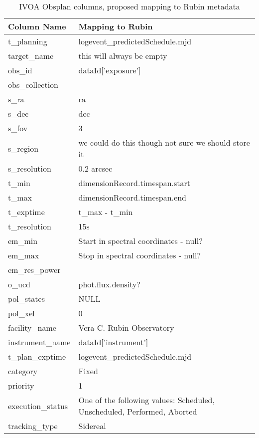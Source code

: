 
\begin{table}
\begin{tabular}{ |l|l| }
\hline
\textbf{Column Name} & \textbf{Mapping to Rubin} \\
\hline
t\_planning & logevent\_predictedSchedule.mjd \\
\hline
target\_name & this will always be empty \\
\hline
obs\_id & dataId['exposure'] \\
\hline
obs\_collection &  \\
\hline
s\_ra & ra \\
\hline
s\_dec & dec \\
\hline
s\_fov  & 3 \\
\hline
s\_region & we could do this though not sure we should store it \\
\hline
s\_resolution & 0.2 arcsec \\
\hline
t\_min & dimensionRecord.timespan.start \\
\hline
t\_max & dimensionRecord.timespan.end \\
\hline
t\_exptime & t\_max - t\_min \\
\hline
t\_resolution & 15s \\
\hline
em\_min & Start in spectral coordinates - null?  \\
\hline
em\_max & Stop in spectral coordinates - null? \\
\hline
em\_res\_power & \\
\hline
o\_ucd &  phot.flux.density? \\
\hline
pol\_states & NULL \\
\hline
pol\_xel & 0\\
\hline
facility\_name & Vera C. Rubin Observatory\\
\hline
instrument\_name &  dataId['instrument'] \\
\hline
t\_plan\_exptime & logevent\_predictedSchedule.mjd \\
\hline
category & Fixed \\
\hline
priority & 1 \\
\hline
execution\_status & One of the following values:  Scheduled, Unscheduled, Performed, Aborted \\
\hline
tracking\_type &  Sidereal \\
\hline
\end{tabular}
\caption{IVOA Obsplan columns, proposed  mapping to Rubin metadata}
\label{tab:schema}
\end{table}
